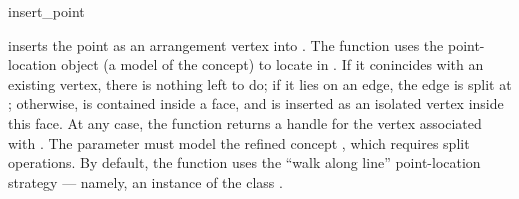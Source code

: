 
\ccRefPageBegin

\begin{ccRefFunction}{insert_point}


   {inserts the point  as an arrangement vertex into .
    The function uses the point-location object  (a model of the
     concept) to locate  in .
    If it conincides with an existing vertex, there is nothing left to
    do; if it lies on an edge, the edge is split at ;
    otherwise,  is contained inside a face, and is inserted as
    an isolated vertex inside this face.
    At any case, the function returns a handle for the vertex associated
    with . The  parameter must model the refined concept
    , which requires split operations.
    By default, the function uses the ``walk along line'' point-location
    strategy --- namely, an instance of the class
    .
    }


\end{ccRefFunction}

\ccRefPageEnd
